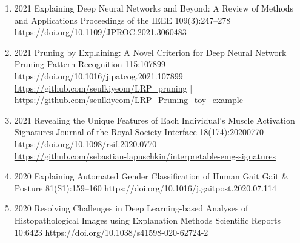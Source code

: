 {\begin{enumerate}
    \item {}
                        {2021}
                        {Explaining Deep Neural Networks and Beyond: A Review of Methods and Applications}
                        {Proceedings of the IEEE}
                        {109(3):247--278}
                        {https://doi.org/10.1109/JPROC.2021.3060483}

    \item {}
                        {2021}
                        {Pruning by Explaining: A Novel Criterion for Deep Neural Network Pruning}
                        {Pattern Recognition}
                        {115:107899}
                        {https://doi.org/10.1016/j.patcog.2021.107899}
                        {\\\href{https://github.com/seulkiyeom/LRP_pruning}{https://github.com/seulkiyeom/LRP\_pruning}
                         | \href{https://github.com/seulkiyeom/LRP_Pruning_toy_example}{https://github.com/seulkiyeom/LRP\_Pruning\_toy\_example}}

    \item {}
                        {2021}
                        {Revealing the Unique Features of Each Individual's Muscle Activation Signatures}
                        {Journal of the Royal Society Interface}
                        {18(174):20200770}
                        {https://doi.org/10.1098/rsif.2020.0770}
                        {\\\href{https://github.com/sebastian-lapuschkin/interpretable-emg-signatures}{https://github.com/sebastian-lapuschkin/interpretable-emg-signatures}}

    \item {}
                        {2020}
                        {Explaining Automated Gender Classification of Human Gait}
                        {Gait \& Posture}
                        {81(S1):159--160}
                        {https://doi.org/10.1016/j.gaitpost.2020.07.114}

    \item {}
                        {2020}
                        {Resolving Challenges in Deep Learning-based Analyses of Histopathological Images using Explanation Methods}
                        {Scientific Reports}
                        {10:6423}
                        {https://doi.org/10.1038/s41598-020-62724-2}


\end{enumerate}}
